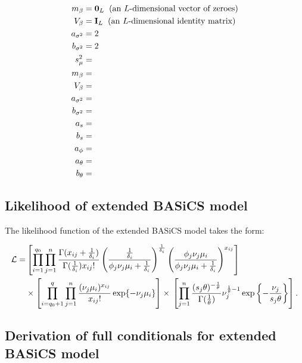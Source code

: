 \begin{align*}
m_{\beta} & = \mathbf{0}_L \hspace{0.2cm} \text{(an $L$-dimensional vector of zeroes)}\\
V_{\beta} & = \mathbf{I}_L \hspace{0.2cm} \text{(an $L$-dimensional identity matrix)}\\
a_{\sigma^2} & = 2\\
b_{\sigma^2} & = 2\\
s^2_{\mu}& =  \\
m_\beta& =  \\
V_\beta& =  \\
a_{\sigma^2}& =  \\
b_{\sigma^2}& =  \\
a_s& =  \\
b_s& =  \\
a_\phi& =  \\
a_\theta& =  \\
b_\theta& = 
\end{align*}

\subsection{Likelihood of extended BASiCS model}

The likelihood function of the extended BASiCS model takes the form:

\begin{align} \label{eq::loglik}
\mathcal{L} = & \left[\prod_{i=1}^{q_0}\prod_{j=1}^n\frac{\Gamma(x_{ij}+\frac{1}{\delta_i})}{\Gamma(\frac{1}{\delta_i})x_{ij}!}\left(\frac{\frac{1}{\delta_i}}{\phi_j\nu_j\mu_i+\frac{1}{\delta_i}}\right)^\frac{1}{\delta_i}\left(\frac{\phi_j\nu_j\mu_i}{\phi_j\nu_j\mu_i+\frac{1}{\delta_i}}\right)^{x_{ij}}\right] \nonumber\\ 
&\times\left[\prod_{i=q_0+1}^{q}\prod_{j=1}^n\frac{(\nu_j\mu_i)^{x_{ij}}}{x_{ij}!}\exp\lbrace-\nu_j\mu_i\rbrace\right]\times{}\left[\prod_{j=1}^n\frac{(s_j\theta)^{-\frac{1}{\theta}}}{\Gamma(\frac{1}{\theta})}\nu_j^{\frac{1}{\theta}-1}\exp\left\lbrace-\frac{\nu_j}{s_j\theta}\right\rbrace\right].
\end{align} 

\subsection{Derivation of full conditionals for extended BASiCS model}
\label{appB.1.derivation}

